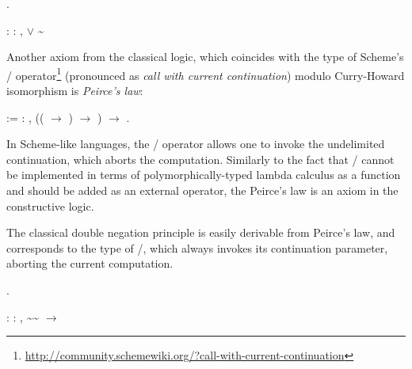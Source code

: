 \begin{coqdoccode}
\coqdocemptyline
\coqdocnoindent
{} .\coqdoceol
\coqdocemptyline
\end{coqdoccode}


\coqdoceol
\coqdocemptyline
\coqdocnoindent
{}\coqdoceol
\coqdocindent{2.50em}
: \coqdockw{\ensuremath{\forall}}  : ,  \ensuremath{\lor} \textasciitilde {}

\coqdocemptyline


Another axiom from the classical logic, which coincides with the type
of Scheme's /
operator\footnote{\url{http://community.schemewiki.org/?call-with-current-continuation}}
(pronounced as \textit{call with current continuation}) modulo Curry-Howard
isomorphism is \textit{Peirce's law}:
\begin{coqdoccode}
\coqdocemptyline
\coqdocnoindent
{}  := \coqdockw{\ensuremath{\forall}}  : , (( \ensuremath{\rightarrow} ) \ensuremath{\rightarrow} ) \ensuremath{\rightarrow} .\coqdoceol
\coqdocemptyline
\end{coqdoccode}


In Scheme-like languages, the / operator allows one to
invoke the undelimited continuation, which aborts the
computation. Similarly to the fact that / cannot be
implemented in terms of polymorphically-typed lambda calculus as a
function and should be added as an external operator, the Peirce's law
is an axiom in the constructive logic.


The classical double negation principle is easily derivable from
Peirce's law, and corresponds to the type of /, which always
invokes its continuation parameter, aborting the current computation.


\begin{coqdoccode}
\coqdocemptyline
\coqdocnoindent
{} .\coqdoceol
\coqdocemptyline
\end{coqdoccode}


\coqdoceol
\coqdocemptyline
\coqdocnoindent
{}\coqdoceol
\coqdocindent{2.50em}
: \coqdockw{\ensuremath{\forall}}  : , \textasciitilde \textasciitilde{} \ensuremath{\rightarrow} 

